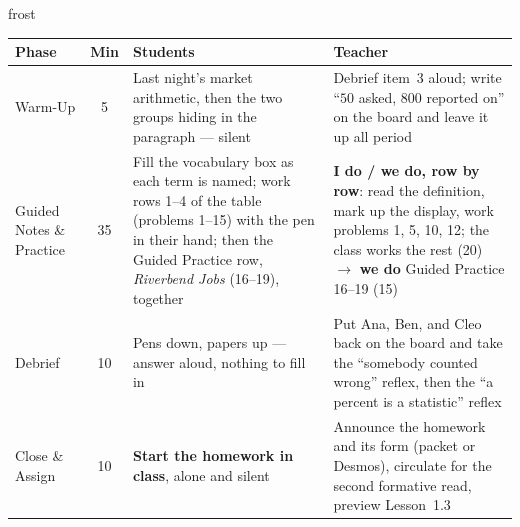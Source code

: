 \documentclass[10pt]{article}
\begin{document}
\begin{fixedskillbox}{frost}
\renewcommand{\arraystretch}{1.25}
\begin{tabularx}{\linewidth}{@{}l c X X@{}}
\textbf{Phase} & \textbf{Min} & \textbf{Students} & \textbf{Teacher} \\
\hline
Warm-Up & 5 & Last night's market arithmetic, then the two groups hiding in the paragraph ---
  silent & Debrief item~3 aloud; write ``$50$ asked, $800$ reported on'' on the board and leave
  it up all period \\
Guided Notes \& Practice & 35 & Fill the vocabulary box as each term is named; work rows
  1--4 of the table (problems 1--15) with the pen in their hand; then the Guided Practice row,
  \emph{Riverbend Jobs} (16--19), together & \textbf{I do / we do, row by row}: read the
  definition, mark up the display, work problems 1, 5, 10, 12; the class works the rest (20)
  $\to$ \textbf{we do} Guided Practice 16--19 (15) \\
Debrief & 10 & Pens down, papers up --- answer aloud, nothing to fill in & Put Ana, Ben, and
  Cleo back on the board and take the ``somebody counted wrong'' reflex, then the
  ``a percent is a statistic'' reflex \\
Close \& Assign & 10 & \textbf{Start the homework in class}, alone and silent & Announce the
  homework and its form (packet or Desmos), circulate for the second formative read, preview
  Lesson~1.3 \\
\end{tabularx}
\end{fixedskillbox}
\end{document}
